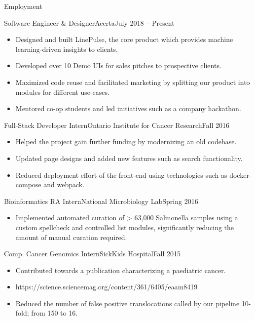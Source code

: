 \documentclass[]{mcdowellcv}
\begin{document}
	\makeheader
	
	\begin{cvsection}{Employment}
		\begin{cvsubsection}{Software Engineer \& Designer}{Acerta}{July 2018 -- Present}
			\begin{itemize}
				\item Designed and built LinePulse, the core product which provides machine learning-driven insights to clients.
				\item Developed over 10 Demo UIs for sales pitches to prospective clients.
				\item Maximized code reuse and facilitated marketing by splitting our product into modules for different use-cases.
				\item Mentored co-op students and led initiatives such as a company hackathon.
			\end{itemize}
		\end{cvsubsection}
		
		\begin{cvsubsection}{Full-Stack Developer Intern}{Ontario Institute for Cancer Research}{Fall 2016}	
			\begin{itemize}
				\item Helped the project gain further funding by modernizing an old codebase.
				\item Updated page designs and added new features such as search functionality.
				\item Reduced deployment effort of the front-end using technologies such as docker-compose and webpack.
			\end{itemize}
		\end{cvsubsection}
		
		\begin{cvsubsection}{Bioinformatics RA Intern}{National Microbiology Lab}{Spring 2016}		
			\begin{itemize}
				\item Implemented automated curation of > 63,000 Salmonella samples using a custom spellcheck and controlled list modules, significantly reducing the amount of manual curation required.
			\end{itemize}
		\end{cvsubsection}
		
		\begin{cvsubsection}{Comp. Cancer Genomics Intern}{SickKids Hospital}{Fall 2015}
			\begin{itemize}
				\item Contributed towards a publication characterizing a paediatric cancer.
				\item https://science.sciencemag.org/content/361/6405/eaam8419	
				\item Reduced the number of false positive translocations called by our pipeline 10-fold; from 150 to 16.
			\end{itemize}
		\end{cvsubsection}
	\end{cvsection}
	
\end{document}

